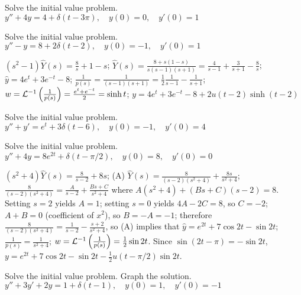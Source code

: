 \documentclass{ximera}
\begin{document}
\begin{problem}\label{exer:8.7.5} 
Solve the initial value
problem.
 $y''+4y=4+\delta(t-3\pi), \quad  y(0)=0,\quad y'(0)=1$
\end{problem}

\begin{problem}\label{exer:8.7.6}
Solve the initial value
problem.
 $y''-y=8+2\delta(t-2), \quad  y(0)=-1,\quad y'(0)=1$

\begin{solution}
$(s^2-1)\hat Y(s)=\frac{8}{s}+1-s$;
$\hat Y(s)=\frac{8+s(1-s)}{s(s-1)(s+1)}=
\frac{4}{s-1}+\frac{3}{s+1}-\frac{8}{s}$;
$\hat y=4e^t+3e^{-t}-8$;
$\frac{1}{p(s)}=\frac{1}{(s-1)(s+1)}=\frac{1}{2}\frac{1}{s-1}
-\frac{1}{s+1}$;
$w={\cal L}^{-1}\left(\frac{1}{p(s)}\right)=\frac{e^t+e^{-t}}{2}=
\sinh t$;
$y=4e^t+3e^{-t}-8+2u(t-2)\sinh(t-2)$
\end{solution}
\end{problem}

\begin{problem}\label{exer:8.7.7}
Solve the initial value
problem.
 $y''+y'=e^t+3\delta(t-6), \quad  y(0)=-1,\quad y'(0)=4$
\end{problem}

\begin{problem}\label{exer:8.7.8}
Solve the initial value
problem.
 $y''+4y=8e^{2t}+\delta(t-\pi/2), \quad  y(0)=8,\quad y'(0)=0$

\begin{solution}
$(s^2+4)\hat Y(s)=\frac{8}{s-2}+8s$;
(A) $\hat Y(s)=\frac{8}{(s-2)(s^2+4)}+\frac{8s}{s^2+4}$;
$\frac{8}{(s-2)(s^2+4)}=\frac{A}{s-2}+\frac{Bs+C}{s^2+4}$
where $A(s^2+4)+(Bs+C)(s-2)=8$. Setting $s=2$ yields $A=1$;
setting $s=0$ yields $4A-2C=8$, so $C=-2$; $A+B=0$
(coefficient of $x^2$), so $B=-A=-1$; therefore
$\frac{8}{(s-2)(s^2+4)}=\frac{1}{s-2}-\frac{s+2}{s^2+4}$, so
(A) implies that
$\hat y=e^{2t}+7\cos2t-\sin2t$;
$\frac{1}{p(s)}=\frac{1}{s^2+4}$;
$w={\cal L}^{-1}\left(\frac{1}{p(s)}\right)=\frac{1}{2}\sin2t$.
Since $\sin(2t-\pi)=-\sin2t$,
$y=e^{2t}+7\cos2t-\sin2t-\frac{1}{2}u(t-\pi/2)\sin2t$.
\end{solution}
\end{problem}

\begin{problem}\label{exer:8.7.9} Solve the initial value problem.  Graph the solution.
 $y''+3y'+2y=1+\delta(t-1), \quad  y(0)=1,\quad y'(0)=-1$
\end{problem}
\end{document}
